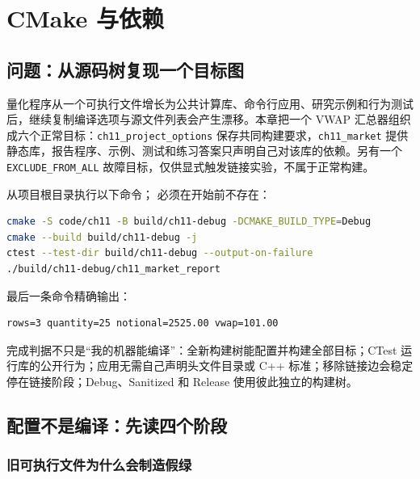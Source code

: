 \chapter{CMake 与依赖}


\section{问题：从源码树复现一个目标图}

量化程序从一个可执行文件增长为公共计算库、命令行应用、研究示例和行为测试后，继续复制编译选项与源文件列表会产生漂移。本章把一个 VWAP 汇总器组织成六个正常目标：\texttt{ch11\_project\_options} 保存共同构建要求，\texttt{ch11\_market} 提供静态库，报告程序、示例、测试和练习答案只声明自己对该库的依赖。另有一个 \texttt{EXCLUDE\_FROM\_ALL} 故障目标，仅供显式触发链接实验，不属于正常构建。

从项目根目录执行以下命令； 必须在开始前不存在：

\begin{lstlisting}[language=bash,numbers=none]
cmake -S code/ch11 -B build/ch11-debug -DCMAKE_BUILD_TYPE=Debug
cmake --build build/ch11-debug -j
ctest --test-dir build/ch11-debug --output-on-failure
./build/ch11-debug/ch11_market_report
\end{lstlisting}

最后一条命令精确输出：

\begin{lstlisting}[numbers=none]
rows=3 quantity=25 notional=2525.00 vwap=101.00
\end{lstlisting}

完成判据不只是“我的机器能编译”：全新构建树能配置并构建全部目标；CTest 运行库的公开行为；应用无需自己声明头文件目录或 C++ 标准；移除链接边会稳定停在链接阶段；Debug、Sanitized 和 Release 使用彼此独立的构建树。

\section{配置不是编译：先读四个阶段}

\subsection{旧可执行文件为什么会制造假绿}

